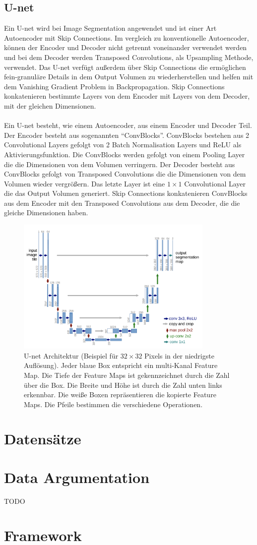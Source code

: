 \subsection{U-net}
Ein U-net wird bei Image Segmentation angewendet und ist einer Art Autoencoder mit Skip Connections. Im vergleich zu konventionelle Autoencoder, können
der Encoder und Decoder nicht getrennt voneinander verwendet werden und bei dem Decoder werden Transposed Convolutions, als Upsampling 
Methode, verwendet. Das U-net verfügt außerdem über Skip Connections die ermöglichen fein-granuläre Details in dem Output Volumen zu 
wiederherstellen und helfen mit dem Vanishing Gradient Problem in Backpropagation. Skip Connections konkatenieren bestimmte Layers von dem
Encoder mit Layers von dem Decoder, mit der gleichen Dimensionen.
\\
\\
Ein U-net besteht, wie einem Autoencoder, aus einem Encoder und Decoder Teil. Der Encoder besteht aus sogenannten ``ConvBlocks''. ConvBlocks
bestehen aus 2 Convolutional Layers gefolgt von 2 Batch Normalisation Layers und ReLU als Aktivierungsfunktion. Die ConvBlocks werden gefolgt
von einem Pooling Layer die die Dimensionen von dem Volumen verringern. Der Decoder besteht aus ConvBlocks gefolgt von Transposed Convolutions
die die Dimensionen von dem Volumen wieder vergrößern. Das letzte Layer ist eine $1 \times 1$ Convolutional Layer die das Output Volumen generiert.
Skip Connections konkatenieren ConvBlocks aus dem Encoder mit den Transposed Convolutions aus dem Decoder, die die gleiche Dimensionen haben.

\begin{figure}[H]
  \centering
  \includegraphics[width=0.85\textwidth]{resources/networks/unet.png}
  \caption{
    U-net Architektur (Beispiel für $32 \times 32$ Pixels in der niedrigste Auflösung). Jeder blaue Box entspricht ein multi-Kanal Feature Map.
    Die Tiefe der Feature Maps ist gekennzeichnet durch die Zahl über die Box. Die Breite und Höhe ist durch die Zahl unten links erkennbar.
    Die weiße Boxen repräsentieren die kopierte Feature Maps. Die Pfeile bestimmen die verschiedene Operationen.
    \cite{ronneberger2015unet}
  }
  \label{image:unet}
\end{figure}


\section{Datensätze}
\section{Data Argumentation}
TODO
\section{Framework}